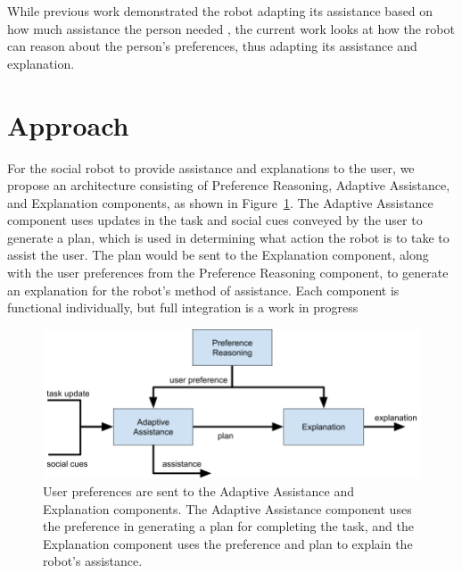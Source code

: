 \documentclass[letterpaper]{article} %
\begin{document}
While previous work demonstrated the robot adapting its assistance based on how much assistance the person needed \cite{wilson2020challenges}, the current work looks at how the robot can reason about the person's preferences, thus adapting its assistance and explanation.

















\section{Approach}


For the social robot to provide assistance and explanations to the user, we propose an
architecture consisting of Preference Reasoning, Adaptive Assistance, and Explanation
components, as shown in Figure~\ref{fig:arch}.  The Adaptive Assistance component uses updates in the task and social cues conveyed by the user to generate a plan, which is used in determining what action the robot is to take to assist the user.  The plan would be sent to the Explanation component, along with the user preferences from the Preference Reasoning component, to generate an explanation for the robot's method of assistance. Each component is functional individually, but full integration is a work in progress

\begin{figure}[h]
\centering
\includegraphics[width=1.0\columnwidth]{architecture.png}
\caption{User preferences are sent to the Adaptive Assistance and Explanation components.  The Adaptive Assistance component uses the preference in generating a plan for completing the task, and the Explanation component uses the preference and plan to explain the robot's assistance.}
\label{fig:arch}
\end{figure}
\end{document}
